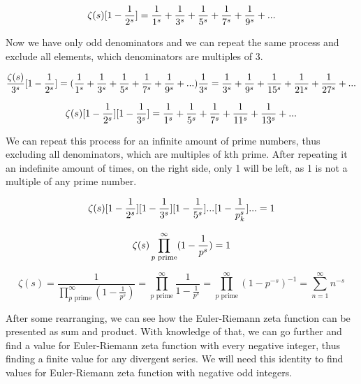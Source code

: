 \documentclass[a4paper]{article}
\begin{document}
\begin{equation*}
  \zeta(s)[1-\frac{1}{2^s}]=\frac{1}{1^s}+\frac{1}{3^s}+\frac{1}{5^s}+
  \frac{1}{7^s}+\frac{1}{9^s}+...\\
  \end{equation*}

Now we have only odd denominators and we can repeat the same process and exclude all elements, which denominators are
multiples of 3.

\begin{equation*}
  \frac{\zeta(s)}{3^s}[1-\frac{1}{2^s}] = (\frac{1}{1^s}+\frac{1}{3^s}+\frac{1}{5^s}+
  \frac{1}{7^s}+\frac{1}{9^s}+...)\frac{1}{3^s}=\frac{1}{3^s}+\frac{1}{9^s}+\frac{1}{15^s}+
  \frac{1}{21^s}+\frac{1}{27^s}+...\\
\end{equation*}

\begin{equation*}
  \zeta(s)[1-\frac{1}{2^s}][1-\frac{1}{3^s}] = \frac{1}{1^s}+\frac{1}{5^s}+\frac{1}{7^s}+
  \frac{1}{11^s}+\frac{1}{13^s}+...\\
  \end{equation*}

We can repeat this process for an infinite amount of prime numbers, thus excluding all
denominators, which are multiples of kth prime. After repeating it an indefinite amount of times,
on the right side, only 1 will be left, as 1 is not a multiple of any prime number.

\begin{equation*}
  \zeta(s)[1-\frac{1}{2^s}][1-\frac{1}{3^s}][1-\frac{1}{5^s}]...[1-\frac{1}{p_k^s}]...=1\\
  \end{equation*}

\begin{equation*}
    \zeta(s)\prod_{p \text{ prime}}^{\infty} (1-\frac{1}{p^s})=1\\
\end{equation*}

\begin{equation*}
  \zeta(s)=\frac{1}{\prod_{p \text{ prime}}^{\infty} (1-\frac{1}{p^s})}=\prod_{p \text{ prime}}^{\infty} \frac{1}{1-\frac{1}{p^s}}=
  \prod_{p \text{ prime}}^{\infty} (1-p^{-s})^{-1}=\sum_{n=1}^{\infty} n^{-s}
  \end{equation*}

After some rearranging, we can see how the Euler-Riemann zeta function can be presented as sum
and product. With knowledge of that, we can go further and find a value for Euler-Riemann zeta
function with every negative integer, thus finding a finite value for any divergent series. We will
need this identity to find values for Euler-Riemann zeta function with negative odd integers.\\
\end{document}
